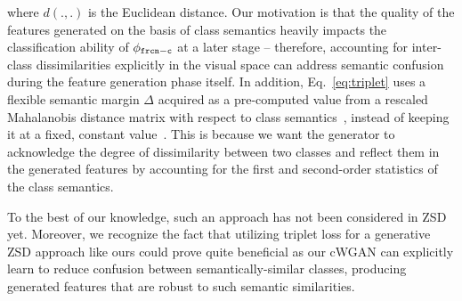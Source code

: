 \documentclass{bmvc2k}
\begin{document}
where $d(.,.)$ is the Euclidean distance. Our motivation is that the quality of the features generated on the basis of class semantics heavily impacts the classification ability of $\phi_{\tt frcn-c}$ at a later stage -- therefore, accounting for inter-class dissimilarities explicitly in the visual space can address semantic confusion during the feature generation phase itself.
In addition, Eq.~\ref{eq:triplet} uses a flexible semantic margin $\Delta$ acquired as a pre-computed value from a rescaled Mahalanobis distance matrix with respect to class semantics~\cite{cacheux2019modeling}, instead of keeping it at a fixed, constant value~\cite{akata2015label, frome2013devise}. This is because we want the generator to acknowledge the degree of dissimilarity between two classes and reflect them in the generated features by accounting for the first and second-order statistics of the class semantics. 

To the best of our knowledge, such an approach has not been considered in ZSD yet. Moreover, we recognize the fact that utilizing triplet loss for a generative ZSD approach like ours could prove quite beneficial as our cWGAN can explicitly learn to reduce confusion between semantically-similar classes, producing generated features that are robust to such semantic similarities.
\end{document}
